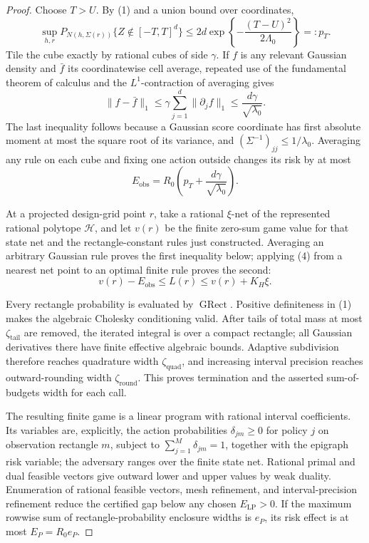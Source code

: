 \documentclass{article}
\begin{document}
\begin{proof}
Choose \(T>U\).  By (1) and a union bound over coordinates,
\[
 \sup_{h,r}P_{N(h,\Sigma(r))}\{Z\notin[-T,T]^d\}
 \leq2d\exp\left\{-\frac{(T-U)^2}{2\Lambda_0}\right\}=:p_T.       \tag{6}
\]
Tile the cube exactly by rational cubes of side \(\gamma\).  If \(f\) is any relevant Gaussian density and \(\bar f\) its coordinatewise cell average, repeated use of the fundamental theorem of calculus and the \(L^1\)-contraction of averaging gives
\[
 \lVert f-\bar f\rVert_1
 \leq\gamma\sum_{j=1}^d\lVert\partial_jf\rVert_1
 \leq\frac{d\gamma}{\sqrt{\lambda_0}}.                             \tag{7}
\]
The last inequality follows because a Gaussian score coordinate has first absolute moment at most the square root of its variance, and \((\Sigma^{-1})_{jj}\leq1/\lambda_0\).  Averaging any rule on each cube and fixing one action outside changes its risk by at most
\[
 E_{\mathrm{obs}}=R_0\left(p_T+\frac{d\gamma}{\sqrt{\lambda_0}}\right). \tag{8}
\]

At a projected design-grid point \(r\), take a rational \(\xi\)-net of the represented rational polytope \(\mathcal H\), and let \(v(r)\) be the finite zero-sum game value for that state net and the rectangle-constant rules just constructed.  Averaging an arbitrary Gaussian rule proves the first inequality below; applying (4) from a nearest net point to an optimal finite rule proves the second:
\[
 v(r)-E_{\mathrm{obs}}\leq L(r)\leq v(r)+K_H\xi.                    \tag{9}
\]

Every rectangle probability is evaluated by \(\operatorname{GRect}\).  Positive definiteness in (1) makes the algebraic Cholesky conditioning valid.  After tails of total mass at most \(\zeta_{\mathrm{tail}}\) are removed, the iterated integral is over a compact rectangle; all Gaussian derivatives there have finite effective algebraic bounds.  Adaptive subdivision therefore reaches quadrature width \(\zeta_{\mathrm{quad}}\), and increasing interval precision reaches outward-rounding width \(\zeta_{\mathrm{round}}\).  This proves termination and the asserted sum-of-budgets width for each call.

The resulting finite game is a linear program with rational interval coefficients.  Its variables are, explicitly, the action probabilities \(\delta_{jm}\geq0\) for policy \(j\) on observation rectangle \(m\), subject to \(\sum_{j=1}^M\delta_{jm}=1\), together with the epigraph risk variable; the adversary ranges over the finite state net.  Rational primal and dual feasible vectors give outward lower and upper values by weak duality.  Enumeration of rational feasible vectors, mesh refinement, and interval-precision refinement reduce the certified gap below any chosen \(E_{\mathrm{LP}}>0\).  If the maximum rowwise sum of rectangle-probability enclosure widths is \(e_P\), its risk effect is at most \(E_P=R_0e_P\).


\end{proof}
\end{document}
